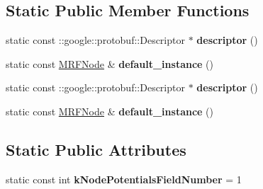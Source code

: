 \subsection*{Static Public Member Functions}
\begin{DoxyCompactItemize}
\item 
\hypertarget{classgraph_1_1MRFNode_af65ea7eb633a923f3edb6731d87bc3e0}{
static const ::google::protobuf::Descriptor $\ast$ {\bfseries descriptor} ()}
\label{classgraph_1_1MRFNode_af65ea7eb633a923f3edb6731d87bc3e0}

\item 
\hypertarget{classgraph_1_1MRFNode_ae314d61e7dc907091eb1d67d665888b7}{
static const \hyperlink{classgraph_1_1MRFNode}{MRFNode} \& {\bfseries default\_\-instance} ()}
\label{classgraph_1_1MRFNode_ae314d61e7dc907091eb1d67d665888b7}

\item 
\hypertarget{classgraph_1_1MRFNode_af65ea7eb633a923f3edb6731d87bc3e0}{
static const ::google::protobuf::Descriptor $\ast$ {\bfseries descriptor} ()}
\label{classgraph_1_1MRFNode_af65ea7eb633a923f3edb6731d87bc3e0}

\item 
\hypertarget{classgraph_1_1MRFNode_ae314d61e7dc907091eb1d67d665888b7}{
static const \hyperlink{classgraph_1_1MRFNode}{MRFNode} \& {\bfseries default\_\-instance} ()}
\label{classgraph_1_1MRFNode_ae314d61e7dc907091eb1d67d665888b7}

\end{DoxyCompactItemize}
\subsection*{Static Public Attributes}
\begin{DoxyCompactItemize}
\item 
\hypertarget{classgraph_1_1MRFNode_a8c72fb8318df08ad3774c388ad62296c}{
static const int {\bfseries kNodePotentialsFieldNumber} = 1}
\label{classgraph_1_1MRFNode_a8c72fb8318df08ad3774c388ad62296c}

\end{DoxyCompactItemize}
